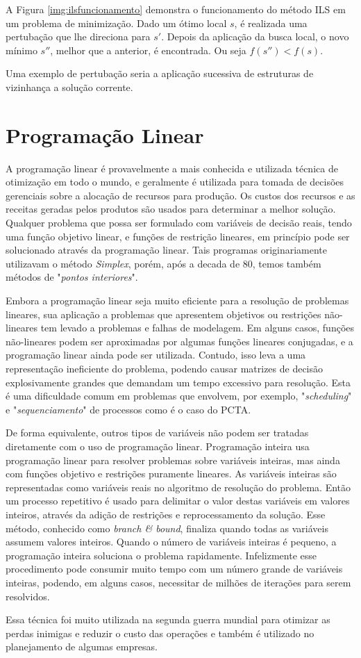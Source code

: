 A Figura \ref{img:ilsfuncionamento} demonstra o funcionamento do método ILS em
um problema de minimização. Dado um ótimo local $s$, é realizada uma pertubação
que lhe direciona para $s{'}$. Depois da aplicação da busca local, o novo
mínimo $s{''}$, melhor que a anterior, é encontrada. Ou seja $f(s{''}) < f(s)$.

Uma exemplo de pertubação seria a aplicação sucessiva de estruturas de
vizinhança a solução corrente.

\section{Programação Linear}

A programação linear é provavelmente a mais conhecida e utilizada técnica de
otimização em todo o mundo, e geralmente é utilizada para tomada de
decisões gerenciais sobre a alocação de recursos para produção. Os custos dos recursos e
as receitas geradas pelos produtos são usados para determinar a melhor solução.
Qualquer problema que possa ser formulado com variáveis de decisão reais, tendo
uma função objetivo linear, e funções de restrição lineares, em princípio pode
ser solucionado através da programação linear. Tais programas originariamente
utilizavam o método \textit{Simplex}, porém, após a decada de 80,
temos também métodos de "\textit{pontos interiores}".

Embora a programação linear seja muito eficiente para a resolução de problemas
lineares, sua aplicação a problemas que apresentem objetivos ou restrições
não-lineares tem levado a problemas e falhas de modelagem. Em alguns casos,
funções não-lineares podem ser aproximadas por algumas funções lineares
conjugadas, e a programação linear ainda pode ser utilizada. Contudo, isso leva
a uma representação ineficiente do problema, podendo causar matrizes de decisão
explosivamente grandes que demandam um tempo excessivo para resolução. Esta é
uma dificuldade comum em problemas que envolvem, por exemplo,
"\textit{scheduling}" e "\textit{sequenciamento}" de processos como é o caso do
PCTA.

De forma equivalente, outros tipos de variáveis não podem ser tratadas
diretamente com o uso de programação linear. Programação inteira usa
programação linear para resolver problemas sobre variáveis inteiras, mas ainda
com funções objetivo e restrições puramente lineares. As variáveis inteiras são
representadas como variáveis reais no algoritmo de resolução do problema. Então
um processo repetitivo é usado para delimitar o valor destas variáveis em
valores inteiros, através da adição de restrições e reprocessamento da solução.
Esse método, conhecido como \textit{branch \& bound}, finaliza quando todas
as variáveis assumem valores inteiros. Quando o número de variáveis inteiras é
pequeno, a programação inteira soluciona o problema rapidamente. Infelizmente
esse procedimento pode consumir muito tempo com um número grande de variáveis
inteiras, podendo, em alguns casos, necessitar de milhões de iterações para
serem resolvidos.
 	
Essa técnica foi muito utilizada na segunda guerra mundial para otimizar as
perdas inimigas e reduzir o custo das operações e também é utilizado no
planejamento de algumas empresas.

